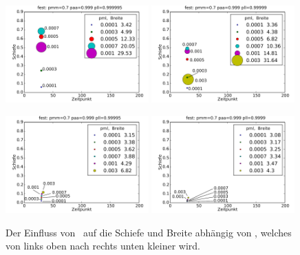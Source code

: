 \begin{figure}[]
\includegraphics[width=0.49\textwidth]{bilder/pml/3fest_07_p_0999_0999995}
\includegraphics[width=0.49\textwidth]{bilder/pml/3fest_07_p_0999_099999}

\vspace*{5pt}

\includegraphics[width=0.49\textwidth]{bilder/pml/3fest_07_p_0999_099995}
\includegraphics[width=0.49\textwidth]{bilder/pml/3fest_07_p_0999_09999}
\caption[Der Einfluss von \pml\ auf die Schiefe und Breite abhängig von \pll]{Der Einfluss von \pml\ auf die Schiefe und Breite abhängig von \pll, welches von links oben nach rechts unten kleiner wird.}
\label{einfluss_pml_1}
\end{figure}


